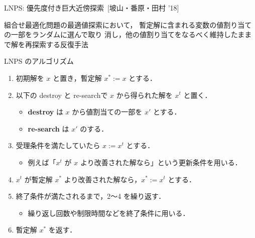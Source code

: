 \documentclass[11pt,dvipdfmx]{beamer}
\begin{document}
\begin{frame}{LNPS: 優先度付き巨大近傍探索~[坡山・番原・田村 '18]}
  \begin{alertblock}{}\centering
    組合せ最適化問題の最適値探索において，
    暫定解に含まれる変数の値割り当ての一部をランダムに選んで取り
    消し，他の値割り当てをなるべく維持したままで解を再探索する反復手法
  \end{alertblock}
  \pause
  \begin{block}{\small LNPS のアルゴリズム}
    \begin{enumerate}
      \compress
      \item 初期解を $x$ と置き，暫定解 $x^{*} := x$ とする．
      \item 以下の destroy と re-searchで $x$ から得られた解を $x^{t}$ と置く．
      \begin{itemize}
        \compress
        \item \alert{\bf destroy} は $x$ から値割当ての一部を $x'$ とする．
        \item \alert{\bf re-search} は $x'$ のする．
      \end{itemize}
      \item 受理条件を満たしていたら $x := x^{t}$ とする．
      \begin{itemize}
        \item 例えば「$x^{t}$ が $x$ より改善された解なら」という更新条件を用いる．
      \end{itemize}
      \item $x^{t}$ が暫定解 $x^{*}$ より改善された解なら，$x^{*} := x^{t}$ とする．
      \item 終了条件が満たされるまで，2〜4 を繰り返す．
      \begin{itemize}
        \item 繰り返し回数や制限時間などを終了条件に用いる．
      \end{itemize}
      \item 暫定解 $x^{*}$ を返す．
    \end{enumerate}
  \end{block}
\end{frame}
\end{document}
